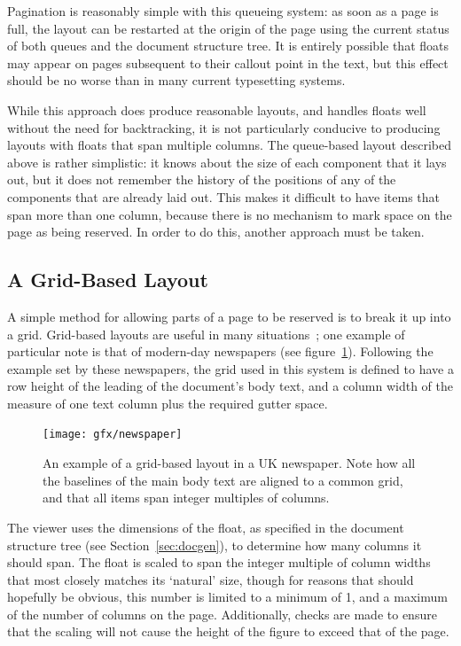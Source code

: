 Pagination is reasonably simple with this queueing system: as soon as a page is full, the layout can be restarted at the origin of the page using the current status of both queues and the document structure tree. It is entirely possible that floats may appear on pages subsequent to their callout point in the text, but this effect should be no worse than in many current typesetting systems.

While this approach does produce reasonable layouts, and handles floats well without the need for backtracking, it is not particularly conducive to producing layouts with floats that span multiple columns. The queue-based layout described above is rather simplistic: it knows about the size of each component that it lays out, but it does not remember the history of the positions of any of the components that are already laid out. This makes it difficult to have items that span more than one column, because there is no mechanism to mark space on the page as being reserved. In order to do this, another approach must be taken.

\subsection{A Grid-Based Layout}
\label{sec:gridlayout}
A simple method for allowing parts of a page to be reserved is to break it up into a grid. Grid-based layouts are useful in many situations~\cite{Collier1991,Bringhurst2008}; one example of particular note is that of modern-day newspapers (see figure~\ref{fig:gridlayout}). Following the example set by these newspapers, the grid used in this system is defined to have a row height of the \gls{leading} of the document's body text, and a column width of the \gls{measure} of one text column plus the required gutter space.

\begin{figure}
    \texttt{[image: gfx/newspaper]}
    \caption[An example of a grid-based layout]{An example of a grid-based layout in a UK newspaper. Note how all the baselines of the main body text are aligned to a common grid, and that all items span integer multiples of columns.}
    \label{fig:gridlayout}
\end{figure}

The viewer uses the dimensions of the float, as specified in the document structure tree (see Section~\ref{sec:docgen}), to determine how many columns it should span. The float is scaled to span the integer multiple of column widths that most closely matches its `natural' size, though for reasons that should hopefully be obvious, this number is limited to a minimum of 1, and a maximum of the number of columns on the page. Additionally, checks are made to ensure that the scaling will not cause the height of the figure to exceed that of the page.

